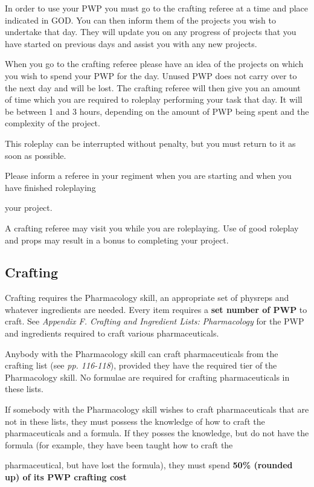 In order to use your PWP you must go to the crafting referee at a time and place indicated in GOD. You can then inform them of the projects you wish to undertake that day. They will update you on any progress of projects that you have started on previous days and assist you with any new projects.

When you go to the crafting referee please have an idea of the projects on which you wish to spend your PWP for the day. Unused PWP does not carry over to the next day and will be lost. The crafting referee will then give you an amount of time which you are required to roleplay performing your task that day. It will be between 1 and 3 hours, depending on the amount of PWP being spent and the complexity of the project.

This roleplay can be interrupted without penalty, but you must return to it as soon as possible.

Please inform a referee in your regiment when you are starting and when you have finished roleplaying

your project.

A crafting referee may visit you while you are roleplaying. Use of good roleplay and props may result in a bonus to completing your project.

\subsection{Crafting}

Crafting requires the Pharmacology skill, an appropriate set of physreps and whatever ingredients are needed. Every item requires a \textbf{set number of PWP} to craft. See \textit{Appendix F. Crafting and Ingredient Lists:} \textit{Pharmacology} for the PWP and ingredients required to craft various pharmaceuticals.

Anybody with the Pharmacology skill can craft pharmaceuticals from the crafting list (see \textit{pp. 116-118}), provided they have the required tier of the Pharmacology skill. No formulae are required for crafting pharmaceuticals in these lists.

If somebody with the Pharmacology skill wishes to craft pharmaceuticals that are not in these lists, they must possess the knowledge of how to craft the pharmaceuticals and a formula. If they posses the knowledge, but do not have the formula (for example, they have been taught how to craft the

pharmaceutical, but have lost the formula), they must spend \textbf{50\% (rounded up) of its PWP crafting cost}

